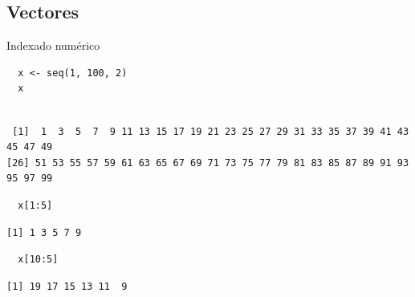 \documentclass[aspectratio=169, usenames,svgnames,dvipsnames]{beamer}
\begin{document}
\subsection{Vectores}
\label{sec:org9f3b9aa}
\begin{frame}[label={sec:orgfe78a4c},fragile]{Indexado numérico}
 \lstset{language=r,label= ,caption= ,captionpos=b,numbers=none}
\begin{lstlisting}
  x <- seq(1, 100, 2)
  x
\end{lstlisting}

\begin{verbatim}

 [1]  1  3  5  7  9 11 13 15 17 19 21 23 25 27 29 31 33 35 37 39 41 43 45 47 49
[26] 51 53 55 57 59 61 63 65 67 69 71 73 75 77 79 81 83 85 87 89 91 93 95 97 99
\end{verbatim}


\lstset{language=r,label= ,caption= ,captionpos=b,numbers=none}
\begin{lstlisting}
  x[1:5]
\end{lstlisting}

\begin{verbatim}
[1] 1 3 5 7 9
\end{verbatim}


\lstset{language=r,label= ,caption= ,captionpos=b,numbers=none}
\begin{lstlisting}
  x[10:5]
\end{lstlisting}

\begin{verbatim}
[1] 19 17 15 13 11  9
\end{verbatim}
\end{frame}
\end{document}
